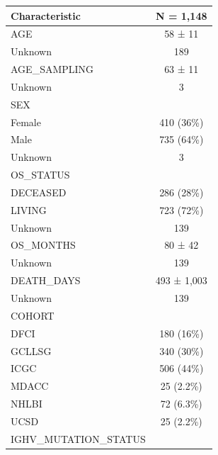 \documentclass[
]{article}
\begin{document}
\begin{longtable}{l|c}
\hline
\textbf{Characteristic} & \textbf{N = 1,148}\\
\hline
AGE & 58 ± 11\\
\hline
\hspace{1em}Unknown & 189\\
\hline
AGE\_SAMPLING & 63 ± 11\\
\hline
\hspace{1em}Unknown & \vphantom{1} 3\\
\hline
SEX & \\
\hline
\hspace{1em}Female & 410 (36\%)\\
\hline
\hspace{1em}Male & 735 (64\%)\\
\hline
\hspace{1em}Unknown & 3\\
\hline
OS\_STATUS & \\
\hline
\hspace{1em}DECEASED & 286 (28\%)\\
\hline
\hspace{1em}LIVING & 723 (72\%)\\
\hline
\hspace{1em}Unknown & \vphantom{6} 139\\
\hline
OS\_MONTHS & 80 ± 42\\
\hline
\hspace{1em}Unknown & \vphantom{5} 139\\
\hline
DEATH\_DAYS & 493 ± 1,003\\
\hline
\hspace{1em}Unknown & \vphantom{4} 139\\
\hline
COHORT & \\
\hline
\hspace{1em}DFCI & 180 (16\%)\\
\hline
\hspace{1em}GCLLSG & 340 (30\%)\\
\hline
\hspace{1em}ICGC & 506 (44\%)\\
\hline
\hspace{1em}MDACC & 25 (2.2\%)\\
\hline
\hspace{1em}NHLBI & 72 (6.3\%)\\
\hline
\hspace{1em}UCSD & 25 (2.2\%)\\
\hline
IGHV\_MUTATION\_STATUS & \\

\end{longtable}
\end{document}
